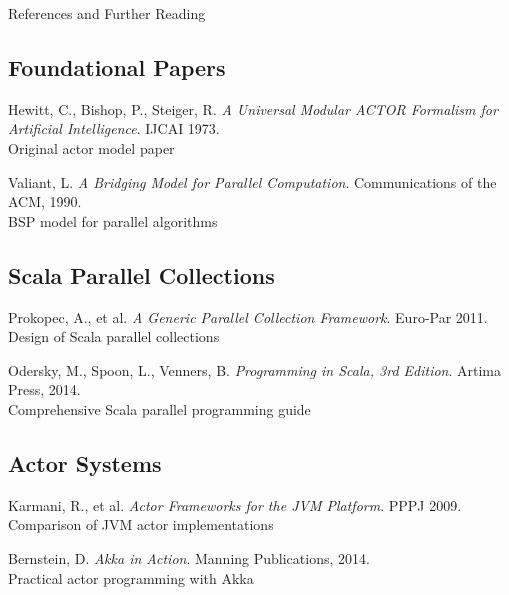 \documentclass{beamer}
\begin{document}
\begin{frame}[allowframebreaks]{References and Further Reading}
\footnotesize

\begin{thebibliography}{15}
\beamertemplatetextbibitems

\subsection*{Foundational Papers}
\textcolor{pureblue}{Hewitt, C., Bishop, P., Steiger, R.} 
\textit{A Universal Modular ACTOR Formalism for Artificial Intelligence}. IJCAI 1973.
\footnotesize{\\ \color{gray}Original actor model paper}

\textcolor{pureblue}{Valiant, L.} 
\textit{A Bridging Model for Parallel Computation}. Communications of the ACM, 1990.
\footnotesize{\\ \color{gray}BSP model for parallel algorithms}

\subsection*{Scala Parallel Collections}
\textcolor{pureblue}{Prokopec, A., et al.} 
\textit{A Generic Parallel Collection Framework}. Euro-Par 2011.
\footnotesize{\\ \color{gray}Design of Scala parallel collections}

\textcolor{pureblue}{Odersky, M., Spoon, L., Venners, B.} 
\textit{Programming in Scala, 3rd Edition}. Artima Press, 2014.
\footnotesize{\\ \color{gray}Comprehensive Scala parallel programming guide}

\subsection*{Actor Systems}
\textcolor{pureblue}{Karmani, R., et al.} 
\textit{Actor Frameworks for the JVM Platform}. PPPJ 2009.
\footnotesize{\\ \color{gray}Comparison of JVM actor implementations}

\textcolor{pureblue}{Bernstein, D.} 
\textit{Akka in Action}. Manning Publications, 2014.
\footnotesize{\\ \color{gray}Practical actor programming with Akka}


\end{thebibliography}
\end{frame}
\end{document}
